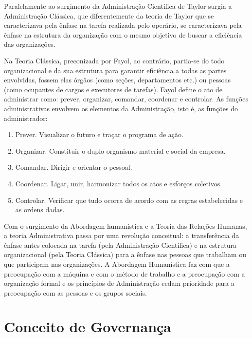 Paralelamente ao surgimento da Administração Científica de Taylor surgia a 
Administração Clássica, que diferentemente da teoria de Taylor que se caracterizava
pela ênfase na tarefa realizada pelo operário, se caracterizava pela ênfase na 
estrutura da organização com o mesmo objetivo de buscar a eficiência das
organizações.

Na Teoria Clássica, preconizada por Fayol, ao contrário, partia-se do todo 
organizacional e da sua estrutura para garantir eficiência a todas as partes 
envolvidas, fossem elas órgãos (como seções, departamentos etc.) ou pessoas 
(como ocupantes de cargos e executores de tarefas).
%
Fayol define o ato de administrar como: prever, organizar, comandar, coordenar 
e controlar. As funções administrativas envolvem os elementos da Administração, 
isto é, as funções do administrador:\cite{chiavenato2001teoria}

\begin{enumerate}

\item Prever. Visualizar o futuro e traçar o programa de ação.

\item Organizar. Constituir o duplo organismo material e social da empresa.

\item Comandar. Dirigir e orientar o pessoal.

\item Coordenar. Ligar, unir, harmonizar todos os atos e esforços coletivos.

\item Controlar. Verificar que tudo ocorra de acordo com as regras estabelecidas 
e as ordens dadas.

\end{enumerate}

Com o surgimento da Abordagem humanística e a Teoria das Relações Humanas,
a teoria Administrativa passa por uma revolução conceitual: a transferência da 
ênfase antes colocada na tarefa (pela Administração Científica) e na estrutura 
organizacional (pela Teoria Clássica) para a ênfase nas pessoas que trabalham 
ou que participam nas organizações. A Abordagem Humanística faz com que a
preocupação com a máquina e com o método de trabalho e a preocupação com a 
organização formal e os princípios de Administração cedam prioridade para a 
preocupação com as pessoas e os grupos sociais.


\section{Conceito de Governança}

